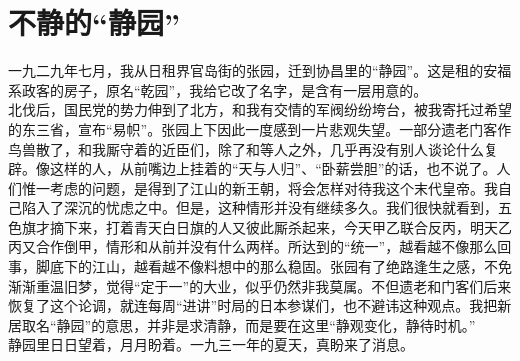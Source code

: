 \fancyhead[RO]{\thepage} %
\fancyhead[LE]{\thepage} %
\chapter*{不静的“静园”}
一九二九年七月，我从日租界官岛街的张园，迁到协昌里的“静园”。这是租的安福系政客的房子，原名“乾园”，我给它改了名字，是含有一层用意的。\\

北伐后，国民党的势力伸到了北方，和我有交情的军阀纷纷垮台，被我寄托过希望的东三省，宣布“易帜”。张园上下因此一度感到一片悲观失望。一部分遗老门客作鸟兽散了，和我厮守着的近臣们，除了和等人之外，几乎再没有别人谈论什么复辟。像这样的人，从前嘴边上挂着的“天与人归”、“卧薪尝胆”的话，也不说了。人们惟一考虑的问题，是得到了江山的新王朝，将会怎样对待我这个末代皇帝。我自己陷入了深沉的忧虑之中。但是，这种情形并没有继续多久。我们很快就看到，五色旗才摘下来，打着青天白日旗的人又彼此厮杀起来，今天甲乙联合反丙，明天乙丙又合作倒甲，情形和从前并没有什么两样。所达到的“统一”，越看越不像那么回事，脚底下的江山，越看越不像料想中的那么稳固。张园有了绝路逢生之感，不免渐渐重温旧梦，觉得“定于一”的大业，似乎仍然非我莫属。不但遗老和门客们后来恢复了这个论调，就连每周“进讲”时局的日本参谋们，也不避讳这种观点。我把新居取名“静园”的意思，并非是求清静，而是要在这里“静观变化，静待时机。”\\

静园里日日望着，月月盼着。一九三一年的夏天，真盼来了消息。\\

